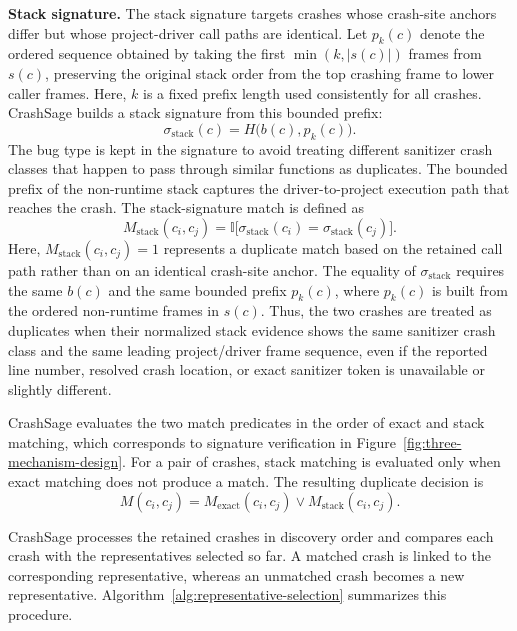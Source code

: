 \documentclass[pdflatex,sn-basic]{sn-jnl}%
\theoremstyle{thmstyleone}%
\theoremstyle{thmstyletwo}%
\theoremstyle{thmstylethree}%
\begin{document}
\textbf{Stack signature.} The stack signature targets crashes whose crash-site anchors differ but whose project-driver call paths are identical.
Let \(p_k(c)\) denote the ordered sequence obtained by taking the first \(\min(k,|s(c)|)\) frames from \(s(c)\), preserving the original stack order from the top crashing frame to lower caller frames.
Here, \(k\) is a fixed prefix length used consistently for all crashes.
CrashSage builds a stack signature from this bounded prefix:
\begin{equation}
\sigma_{\mathrm{stack}}(c)=H\bigl(b(c),p_k(c)\bigr).
\end{equation}
The bug type is kept in the signature to avoid treating different sanitizer crash classes that happen to pass through similar functions as duplicates.
The bounded prefix of the non-runtime stack captures the driver-to-project execution path that reaches the crash.
The stack-signature match is defined as
\begin{equation}
M_{\mathrm{stack}}(c_i,c_j)=
\mathbb{I}\bigl[
\sigma_{\mathrm{stack}}(c_i)=\sigma_{\mathrm{stack}}(c_j)
\bigr].
\end{equation}
Here, \(M_{\mathrm{stack}}(c_i,c_j)=1\) represents a duplicate match based on the retained call path rather than on an identical crash-site anchor.
The equality of \(\sigma_{\mathrm{stack}}\) requires the same \(b(c)\) and the same bounded prefix \(p_k(c)\), where \(p_k(c)\) is built from the ordered non-runtime frames in \(s(c)\).
Thus, the two crashes are treated as duplicates when their normalized stack evidence shows the same sanitizer crash class and the same leading project/driver frame sequence, even if the reported line number, resolved crash location, or exact sanitizer token is unavailable or slightly different.

CrashSage evaluates the two match predicates in the order of exact and stack matching, which corresponds to signature verification in Figure~\ref{fig:three-mechanism-design}.
For a pair of crashes, stack matching is evaluated only when exact matching does not produce a match.
The resulting duplicate decision is
\begin{equation}
M(c_i,c_j)=
M_{\mathrm{exact}}(c_i,c_j)
\lor M_{\mathrm{stack}}(c_i,c_j).
\end{equation}

CrashSage processes the retained crashes in discovery order and compares each crash with the representatives selected so far.
A matched crash is linked to the corresponding representative, whereas an unmatched crash becomes a new representative.
Algorithm~\ref{alg:representative-selection} summarizes this procedure.
\end{document}
